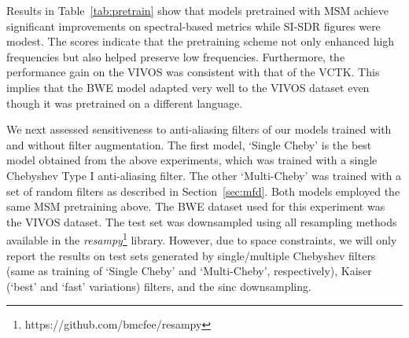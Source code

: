 \documentclass{article}
\begin{document}
Results in Table~\ref{tab:pretrain} show that models pretrained with MSM achieve significant improvements on spectral-based metrics while SI-SDR figures were modest. The scores indicate that the pretraining scheme not only enhanced high frequencies but also helped preserve low frequencies. Furthermore, the performance gain on the VIVOS was consistent with that of the VCTK. This implies that the BWE model adapted very well to the VIVOS dataset even though it was pretrained on a different language.
\begin{table}
\centering
\caption{BWE results on VCTK and VIVOS datasets when employing MSM pretraining.}
\label{tab:pretrain}
\end{table}



We next assessed sensitiveness to anti-aliasing filters of our models trained with and without filter augmentation. The first model, `Single Cheby' is the best model obtained from the above experiments, which was trained with a single Chebyshev Type I anti-aliasing filter. The other `Multi-Cheby' was trained with a set of random filters as described in Section~\ref{sec:mfd}. Both models employed the same MSM pretraining above. The BWE dataset used for this experiment was the VIVOS dataset. The test set was downsampled using all resampling methods available in the \textit{resampy}\footnote{https://github.com/bmcfee/resampy} library. However, due to space constraints, we will only report the results on test sets generated by single/multiple Chebyshev filters (same as training of `Single Cheby' and `Multi-Cheby', respectively), Kaiser (`best' and `fast' variations) filters, and the sinc downsampling.
\end{document}

